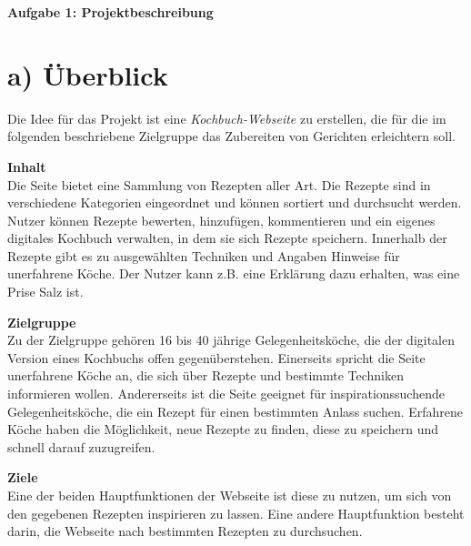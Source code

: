 \documentclass[parskip,10pt,abstracton]{scrartcl}
\renewcommand*{\maketitle}{%
	{\centering\LARGE\sffamily\bfseries Aufgabe 1: Projektbeschreibung \par}
	\vspace{3em}
}
\begin{document}
\maketitle


\section*{a) Überblick}

Die Idee für das Projekt ist eine \textit{Kochbuch-Webseite} zu erstellen, die für die im folgenden beschriebene Zielgruppe das Zubereiten von Gerichten erleichtern soll.

\textbf{Inhalt}\\
Die Seite bietet eine Sammlung von Rezepten aller Art.
Die Rezepte sind in verschiedene Kategorien eingeordnet und können sortiert und durchsucht werden.
Nutzer können Rezepte bewerten, hinzufügen, kommentieren und ein eigenes digitales Kochbuch verwalten, in dem sie sich Rezepte speichern.
Innerhalb der Rezepte gibt es zu ausgewählten Techniken und Angaben Hinweise für unerfahrene Köche. Der Nutzer kann z.B. eine Erklärung dazu erhalten, was eine Prise Salz ist.

\textbf{Zielgruppe}\\
Zu der Zielgruppe gehören 16 bis 40 jährige Gelegenheitsköche, die der digitalen Version eines Kochbuchs offen gegenüberstehen.
Einerseits spricht die Seite unerfahrene Köche an, die sich über Rezepte und bestimmte Techniken informieren wollen. Andererseits ist die Seite geeignet für inspirationssuchende Gelegenheitsköche, die ein Rezept für einen bestimmten Anlass suchen. Erfahrene Köche haben die Möglichkeit, neue Rezepte zu finden, diese zu speichern und schnell darauf zuzugreifen. 

\textbf{Ziele} \\
Eine der beiden Hauptfunktionen der Webseite ist diese zu nutzen, um sich von den gegebenen Rezepten inspirieren zu lassen. Eine andere Hauptfunktion besteht darin, die Webseite nach bestimmten Rezepten zu durchsuchen. 

% 
% 
\end{document}
